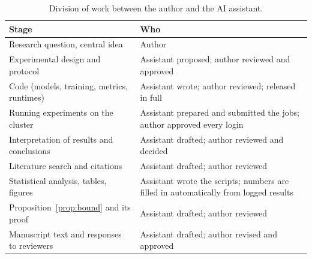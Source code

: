 \begin{table}[H]
\caption{Division of work between the author and the AI assistant.\label{tab:genai}}
\centering
\footnotesize
\begin{tabular}{p{}p{}}
\toprule
\textbf{Stage} & \textbf{Who} \\
\midrule
Research question, central idea & Author \\
Experimental design and protocol & Assistant proposed; author reviewed and approved \\
Code (models, training, metrics, runtimes) & Assistant wrote; author reviewed; released in full \\
Running experiments on the cluster & Assistant prepared and submitted the jobs; author approved every login \\
Interpretation of results and conclusions & Assistant drafted; author reviewed and decided \\
Literature search and citations & Assistant drafted; author reviewed \\
Statistical analysis, tables, figures & Assistant wrote the scripts; numbers are filled in automatically from logged results \\
Proposition~\ref{prop:bound} and its proof & Assistant drafted; author reviewed \\
Manuscript text and responses to reviewers & Assistant drafted; author revised and approved \\
\bottomrule
\end{tabular}
\end{table}
